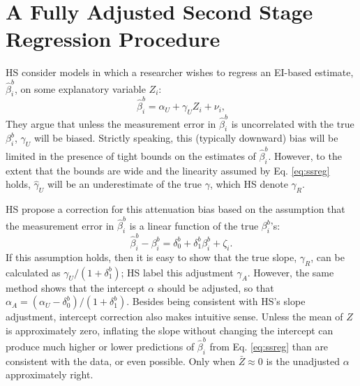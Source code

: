 \documentclass[11pt,titlepage]{article}
\begin{document}
\section{A Fully Adjusted Second Stage Regression Procedure}
\label{s:fulladj}

HS consider models in which a researcher wishes to regress an EI-based
estimate, $\hat\beta_i^b$, on some explanatory variable $Z_i$:
\begin{equation}
  \label{eq:ssreg}
  \hat\beta_i^b=\alpha_U+\gamma_U Z_i + \nu_i,
\end{equation}
They argue that unless the measurement error in $\hat\beta_i^b$ is
uncorrelated with the true $\beta_i^b$, $\gamma_U$ will be biased.
Strictly speaking, this (typically downward) bias will be limited in
the presence of tight bounds on the estimates of $\hat\beta_i^b$.
However, to the extent that the bounds are wide and the linearity
assumed by Eq. \ref{eq:ssreg} holds, $\hat\gamma_U$ will be an
underestimate of the true $\gamma$, which HS denote $\gamma_R$.

HS propose a correction for this attenuation bias based on the
assumption that the measurement error in $\hat\beta_i^b$ is a linear
function of the true $\beta_i^b$'s:
\begin{equation}
  \label{eq:hserr}
  \hat\beta_i^b - \beta_i^b = \delta_0^b + \delta_1^b\beta_i^b + \zeta_i.
\end{equation}
If this assumption holds, then it is easy to show that the true slope,
$\gamma_R$, can be calculated as $\gamma_U/(1 + \delta_1^b)$; HS label
this adjustment $\gamma_A$.  However, the same method shows that the
intercept $\alpha$ should be adjusted, so that $\alpha_A =
(\alpha_U-\delta_0^b)/(1+\delta_1^b)$.  Besides being consistent with
HS's slope adjustment, intercept correction also makes intuitive
sense.  Unless the mean of $Z$ is approximately zero, inflating the
slope without changing the intercept can produce much higher or lower
predictions of $\hat\beta_i^b$ from Eq.  \ref{eq:ssreg} than are
consistent with the data, or even possible.  Only when $\bar Z \approx
0$ is the unadjusted $\alpha$ approximately right.
\end{document}
